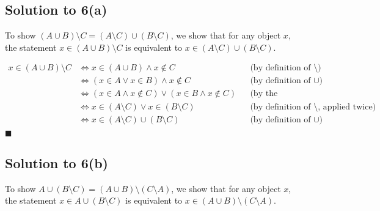 \documentclass{scrartcl}
\begin{document}
    \subsection*{Solution to 6(a)}
    To show $(A \cup B) \setminus C = (A \setminus C) \cup (B \setminus C)$, we show that for any object $x$, \\
    the statement $x \in (A \cup B) \setminus C$ is equivalent to $x \in (A \setminus C) \cup (B \setminus C)$.

    \begin{align*}
        x \in (A \cup B) \setminus C
        &\Leftrightarrow x \in (A \cup B) \wedge x \notin C 
        && \text{(by definition of $\setminus$)} \\
        &\Leftrightarrow (x \in A \vee x \in B) \wedge x \notin C
        && \text{(by definition of $\cup$)} \\
        &\Leftrightarrow  (x \in A \wedge x \notin C) \vee (x \in B \wedge x \notin C)
        && \text{(by the Distributive Law)} \\
        &\Leftrightarrow  x \in (A \setminus C) \vee x \in (B \setminus C)
        && \text{(by definition of $\setminus$, applied twice)} \\
        &\Leftrightarrow  x \in (A \setminus C) \cup (B \setminus C)
        && \text{(by definition of $\cup$)} \\
    \end{align*}
    \hfill $\blacksquare$

    \subsection*{Solution to 6(b)}
        To show $A \cup (B \setminus C) = (A \cup B) \setminus (C \setminus A)$, we show that for any object $x$, \\
        the statement $x \in A \cup (B \setminus C)$ is equivalent to $x \in (A \cup B) \setminus (C \setminus A)$.
\end{document}
